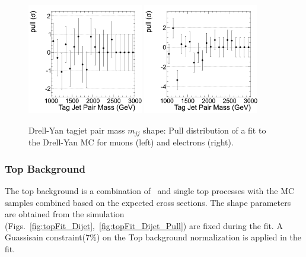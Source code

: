 \begin{figure}
\begin{center}
\includegraphics[width=0.45\textwidth]{figs/wpj/EWKW2jetstagjetmjj_ZpJ_muon_Model_12_Validate_pull.png}
\includegraphics[width=0.45\textwidth]{figs/wpj/EWKW2jetstagjetmjj_ZpJ_electron_Model_12_Validate_pull.png}
\end{center}
\caption{\label{fig:zjetFit} Drell-Yan tagjet pair mass $m_{jj}$ shape: Pull distribution of a fit to the Drell-Yan MC for muons (left) and electrons (right).}
\label{fig:zjetsFit_Dijet_Pull}
\end{figure}

\subsubsection{Top Background}
The top background is a combination of \ttbar\ and single top processes with the MC samples combined based on the expected cross sections. 
The shape parameters are obtained from the simulation (Figs.~\ref{fig:topFit_Dijet},~\ref{fig:topFit_Dijet_Pull}) are fixed during the fit. A Guassisain constraint(7\%) on the Top background normalization is applied in the fit.


